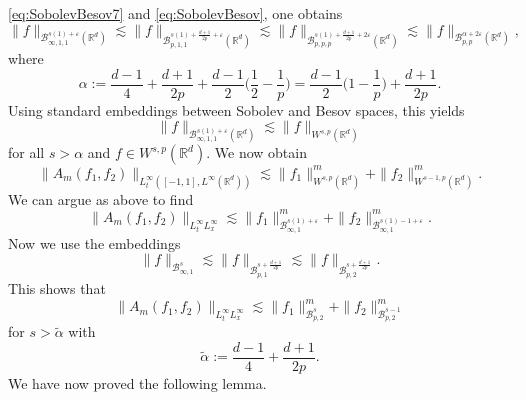 \documentclass{amsart}
\theoremstyle{definition}
\newcommand {\Rd}{\mathbb{R}^{d}}
\newcommand {\Ba}{\mathcal{B}}
\newcommand {\veps}{\varepsilon}
\numberwithin{equation}{section}
\begin{document}
{\eqref{eq:SobolevBesov7} and \eqref{eq:SobolevBesov}, one obtains
\begin{equation*}
\| f \|_{\mathcal{B}^{s(1)+\varepsilon}_{\infty,1,1}(\Rd)} \lesssim \| f \|_{\mathcal{B}^{s(1)+\frac{d+1}{2p}+\varepsilon}_{p,1,1}(\Rd)} \lesssim \| f \|_{\mathcal{B}^{s(1)+\frac{d+1}{2p}+2\varepsilon}_{p,p,p}(\Rd)} \lesssim \|f\|_{\Ba^{\alpha+2\veps}_{p,p}(\Rd)},
\end{equation*}
where
\[
\alpha := \frac{d-1}{4}+\frac{d+1}{2p} + \frac{d-1}{2} \Big( \frac{1}{2} - \frac{1}{p} \Big) = \frac{d-1}{2} \Big( 1 - \frac{1}{p} \Big) + \frac{d+1}{2p}.
\]
Using standard embeddings between Sobolev and Besov spaces, this yields
\[
\|f\|_{\mathcal{B}^{s(1)+\varepsilon}_{\infty,1,1}(\Rd)}\lesssim \| f \|_{W^{s,p}(\Rd)}
\]
for all $s>\alpha$ and $f\in W^{s,p}(\Rd)$.
We now obtain
\begin{equation*}
\| A_m(f_1,f_2) \|_{L_t^\infty([-1,1],L^\infty (\Rd))}\lesssim \| f_1 \|^m_{W^{s,p}(\Rd)} + \| f_2 \|^m_{W^{s-1,p}(\Rd)}.
\end{equation*}
We can argue as above to find
\begin{equation*}
\| A_m(f_1,f_2) \|_{L_t^\infty L_x^\infty} \lesssim \| f_1 \|^m_{\mathcal{B}^{s(1)+\varepsilon}_{\infty,1}} + \|f_2 \|^m_{\mathcal{B}^{s(1)-1+\varepsilon}_{\infty,1}}.
\end{equation*}
Now we use the embeddings
\begin{equation*}
\| f \|_{\mathcal{B}^{s}_{\infty,1}} \lesssim \| f \|_{\mathcal{B}^{s+\frac{d+1}{2p}}_{p,1}} \lesssim \| f \|_{\mathcal{B}^{s+\frac{d+1}{2p}}_{p,2}}.
\end{equation*}
This shows that 
\begin{equation*}
\| A_m(f_1,f_2) \|_{L_t^\infty L_x^\infty} \lesssim \| f_1 \|^m_{\mathcal{B}^{s}_{p,2}} + \| f_2 \|^m_{\mathcal{B}^{s-1}_{p,2}}
\end{equation*}
for $s> \tilde{\alpha}$ with
\begin{equation}
\label{eq:RegularityAdaptedSpaces}
\tilde{\alpha} := \frac{d-1}{4} + \frac{d+1}{2p}.
\end{equation}
We have now proved the following lemma.

}
\end{document}
